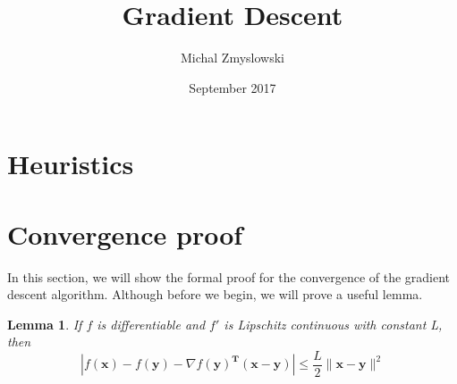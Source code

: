 \documentclass{article}
\title{Gradient Descent}
\author{Michal Zmyslowski}
\date{September 2017}
\newtheorem{lemma}{Lemma}
\begin{document}
\maketitle
\section{Heuristics}

\section{Convergence proof}
In this section, we will show the formal proof for the convergence of the gradient descent algorithm. Although before we begin, we will prove a useful lemma.
\begin{lemma}
If $f$ is differentiable and $f'$ is Lipschitz continuous with constant L, then $$|f(\mathbf{x})-f(\mathbf{y})-\nabla f(\mathbf{y})^\mathbf{T}(\mathbf{x}-\mathbf{y})|\leq\frac{L}{2}\|\mathbf{x}-\mathbf{y}\|^2$$
\end{lemma}
\end{document}
